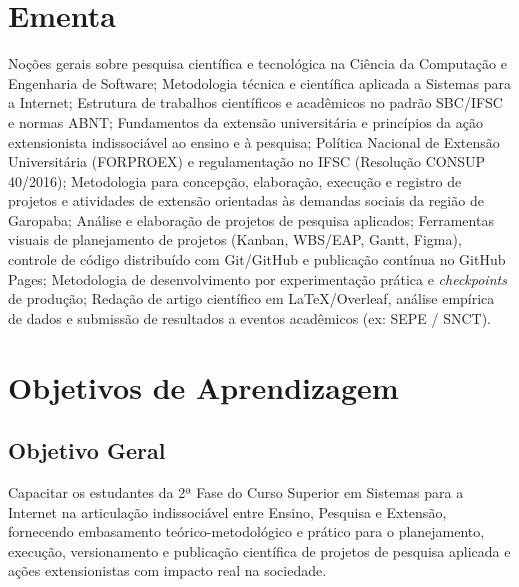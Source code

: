 \documentclass[12pt,a4paper]{article}
\begin{document}
\section{Ementa}

Noções gerais sobre pesquisa científica e tecnológica na Ciência da Computação e Engenharia de Software; Metodologia técnica e científica aplicada a Sistemas para a Internet; Estrutura de trabalhos científicos e acadêmicos no padrão SBC/IFSC e normas ABNT; Fundamentos da extensão universitária e princípios da ação extensionista indissociável ao ensino e à pesquisa; Política Nacional de Extensão Universitária (FORPROEX) e regulamentação no IFSC (Resolução CONSUP 40/2016); Metodologia para concepção, elaboração, execução e registro de projetos e atividades de extensão orientadas às demandas sociais da região de Garopaba; Análise e elaboração de projetos de pesquisa aplicados; Ferramentas visuais de planejamento de projetos (Kanban, WBS/EAP, Gantt, Figma), controle de código distribuído com Git/GitHub e publicação contínua no GitHub Pages; Metodologia de desenvolvimento por experimentação prática e \textit{checkpoints} de produção; Redação de artigo científico em LaTeX/Overleaf, análise empírica de dados e submissão de resultados a eventos acadêmicos (ex: SEPE / SNCT).

\section{Objetivos de Aprendizagem}

\subsection{Objetivo Geral}
Capacitar os estudantes da 2ª Fase do Curso Superior em Sistemas para a Internet na articulação indissociável entre Ensino, Pesquisa e Extensão, fornecendo embasamento teórico-metodológico e prático para o planejamento, execução, versionamento e publicação científica de projetos de pesquisa aplicada e ações extensionistas com impacto real na sociedade.
\end{document}
